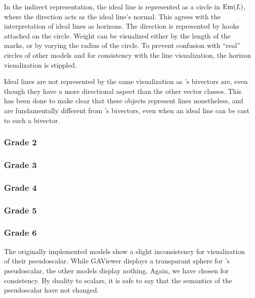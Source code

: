 In the indirect representation, the ideal line is represented as a circle in $\operatorname{Em}(L)$, where the direction acts as the ideal line's normal.  This agrees with the interpretation of ideal lines as horizons.  The direction is represented by hooks attached on the circle.  Weight can be visualized either by the length of the marks, or by varying the radius of the circle.  To prevent confusion with ``real'' circles of other models and for consistency with the line visualization, the horizon visualization is stippled.

Ideal lines are not represented by the same visualization as \ega's bivectors are, even though they have a more directional aspect than the other vector classes.  This has been done to make clear that these objects represent lines nonetheless, and are fundamentally different from \ega's bivectors, even when an ideal line can be cast to such a bivector.



\subsubsection{Grade 2}


\subsubsection{Grade 3}


\subsubsection{Grade 4}


\subsubsection{Grade 5}


\subsubsection{Grade 6}
The originally implemented models show a slight inconsistency for visualization of their pseudoscalar.  While GAViewer displays a transparant sphere for \ega{}'s pseudoscalar, the other models display nothing.  Again, we have chosen for consistency.  By duality to scalars, it is safe to say that the semantics of the pseudoscalar have not changed.
